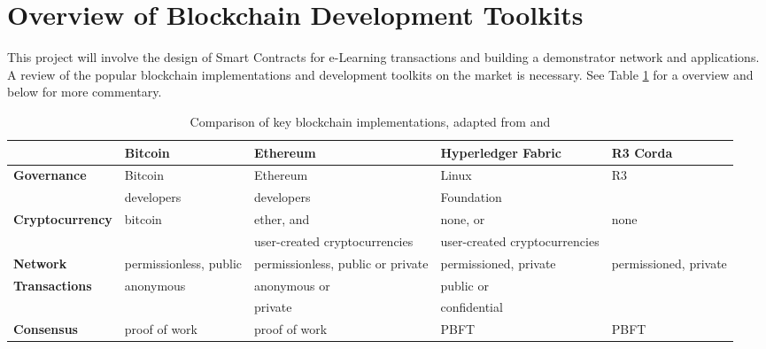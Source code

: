 \section{Overview of Blockchain Development Toolkits}

This project will involve the design of Smart Contracts for e-Learning transactions and building a demonstrator
network and applications. A review of the popular blockchain implementations and development toolkits on the
market is necessary. See Table \ref{table:blockchainscomparison} for a overview and below for more commentary.

\begin{table}[!ht]
	\caption[Comparison of key blockchain implementations, eg. Ethereum, Fabric, R3]
	{Comparison of key blockchain implementations, adapted from \citet{ibm2018hyperledger} and \citet{valenta2017comparison}}
	\centering
	\label{table:blockchainscomparison}
	\begin{tabularx}{\textwidth}{>{\bfseries}lXXXX}
		\toprule
		                & \textbf{Bitcoin}       & \textbf{Ethereum}                 & \textbf{Hyperledger Fabric}   & \textbf{R3 Corda}     \\
		\midrule
		Governance      & Bitcoin                & Ethereum                          & Linux                         & R3                    \\
		                & developers             & developers                        & Foundation                                            \\
		\midrule
		Cryptocurrency  & bitcoin                & ether, and                        & none, or                      & none                  \\
		                &                        & user-created cryptocurrencies     & user-created cryptocurrencies &                       \\
		\midrule
		Network         & permissionless, public & permissionless, public or private & permissioned, private         & permissioned, private \\
		\midrule
		Transactions    & anonymous              & anonymous or                      & public or                     &                       \\
		                &                        & private                           & confidential                  &                       \\
		\midrule
		Consensus       & proof of work          & proof of work                     & PBFT                          & PBFT                  \\

\end{tabularx}
\end{table}
